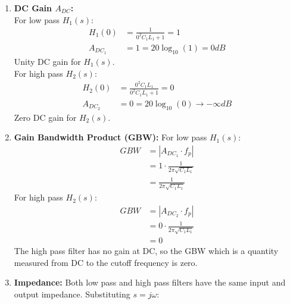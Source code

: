 \begin{enumerate}
    No zeroes for \(H_1(s)\). \\
    For high pass \(H_2(s)\):
    \begin{align*}
        N_2(s) &= 0 \\
        s^2C_1L_1 &= 0 \\
        s^2 &= 0 \hspace{1cm} [\div C_1 L_1] \\
        s_z &= 0 \hspace{1cm} \text{[let \(s = s_z\); a double zero, } s^2\text{]} \\
        f_z &= \frac{|s_z|}{2\pi} = 0 Hz
    \end{align*}
    Double zero at the origin for \(H_2(s)\) (\(+40\,dB\)/decade below \(f_p\)).
  \item \textbf{DC Gain \(A_{DC}\):} \\
    For low pass \(H_1(s)\):
    \begin{align*}
      H_1(0) &= \frac{1}{0^2C_1L_1 + 1} = 1 \\
      A_{DC_1} &= 1 = 20\log_{10}(1) = 0 dB
    \end{align*}
    Unity DC gain for \(H_1(s)\). \\
    For high pass \(H_2(s)\):
    \begin{align*}
      H_2(0) &= \frac{0^2C_1L_1}{0^2C_1L_1 + 1} = 0 \\
      A_{DC_2} &= 0 = 20\log_{10}(0) \to -\infty dB
    \end{align*}
    Zero DC gain for \(H_2(s)\).
  \item \textbf{Gain Bandwidth Product (GBW):}
    For low pass \(H_1(s)\):
    \begin{align*}
      GBW &= |A_{DC_1} \cdot f_p| \\
          &= 1 \cdot \frac{1}{2 \pi \sqrt{C_1L_1}} \\
          &= \frac{1}{2 \pi \sqrt{C_1L_1}}
    \end{align*}
    For high pass \(H_2(s)\):
    \begin{align*}
      GBW &= |A_{DC_2} \cdot f_p| \\
          &= 0 \cdot \frac{1}{2 \pi \sqrt{C_1L_1}} \\
          &= 0
    \end{align*}
    The high pass filter has no gain at DC, so the GBW which
    is a quantity measured from DC to the cutoff frequency is
    zero.
  \item \textbf{Impedance:}
    Both low pass and high pass filters have the same input
    and output impedance.
    Substituting \(s = j \omega\):

\end{enumerate}
